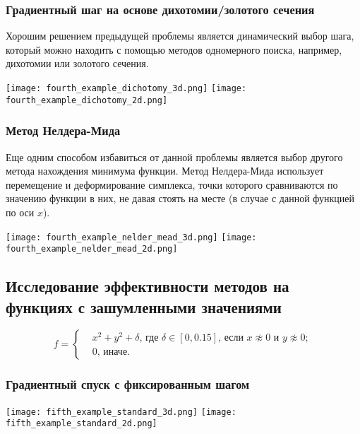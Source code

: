 \documentclass{article}
\begin{document}
\subsubsection*{Градиентный шаг на основе дихотомии/золотого сечения}
Хорошим решением предыдущей проблемы является динамический выбор шага, который можно находить с помощью методов одномерного поиска, например, дихотомии или золотого сечения.
\begin{center}
    \texttt{[image: fourth\_example\_dichotomy\_3d.png]}
    \texttt{[image: fourth\_example\_dichotomy\_2d.png]}
    \label{fig:enter-label}
\end{center}
\subsubsection*{Метод Нелдера-Мида}
Еще одним способом избавиться от данной проблемы является выбор другого метода нахождения минимума функции. Метод Нелдера-Мида использует перемещение и деформирование симплекса, точки которого сравниваются по значению функции в них, не давая стоять на месте (в случае с данной функцией по оси $x$).
\begin{center}
    \texttt{[image: fourth\_example\_nelder\_mead\_3d.png]}
    \texttt{[image: fourth\_example\_nelder\_mead\_2d.png]}
    \label{fig:enter-label}
\end{center}
\subsection*{Исследование эффективности методов на функциях с зашумленными значениями}
\[
f = 
    \left\{
        \begin{aligned}
            &x^2 + y^2 + \delta \text{, где } \delta \in [0, 0.15] \text{, если } x \not \approx 0 \text{ и } y \not \approx 0; \\
            & 0 \text{, иначе}.
        \end{aligned}
    \right.
\]
\subsubsection*{Градиентный спуск с фиксированным шагом}
\begin{center}
    \texttt{[image: fifth\_example\_standard\_3d.png]}
    \texttt{[image: fifth\_example\_standard\_2d.png]}
    \label{fig:enter-label}
\end{center}
\end{document}
